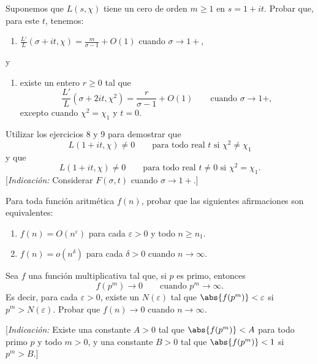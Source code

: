 \documentclass[12pt,a4paper]{book}
\begin{document}
    \begin{ejercicio}
        Suponemos que $L(s,\chi)$ tiene un cero de orden $m\geq1$ en $s=1+it$. Probar que, para
        este $t$, tenemos:
        \begin{enumerate}
            \item[(a)] $\displaystyle\frac{L'}{L}(\sigma+it,\chi)=\frac{m}{\sigma-1}+O(1)$ cuando $\sigma\to1+$,
        \end{enumerate}
        y
        \begin{enumerate}
            \item[(b)] existe un entero $r\geq0$ tal que
            \begin{equation*}
                \frac{L'}{L}(\sigma+2it,\chi^{2})=\frac{r}{\sigma-1}+O(1)\qquad\text{cuando }\sigma\to1+,
            \end{equation*}
            excepto cuando $\chi^{2}=\chi_{1}$ y $t=0$.
        \end{enumerate}
    \end{ejercicio}

    \begin{ejercicio}
        Utilizar los ejercicios 8 y 9 para demostrar que
        \begin{equation*}
            L(1+it,\chi)\neq0\qquad\text{para todo real }t\text{ si }\chi^{2}\neq\chi_{1}
        \end{equation*}
        y que
        \begin{equation*}
            L(1+it,\chi)\neq0\qquad\text{para todo real }t\neq0\text{ si }\chi^{2}=\chi_{1}.
        \end{equation*}
        [\textit{Indicación:} Considerar $F(\sigma,t)$ cuando $\sigma\to1+$.]
    \end{ejercicio}

    \begin{ejercicio}
        Para toda función aritmética $f(n)$, probar que las siguientes afirmaciones son
        equivalentes:
        \begin{enumerate}
            \item[(a)] $f(n)=O(n^{\varepsilon})$ para cada $\varepsilon>0$ y todo
            $n\geq n_{1}$.
            \item[(b)] $f(n)=o(n^{\delta})$ para cada $\delta>0$ cuando $n\to\infty$.
        \end{enumerate}
    \end{ejercicio}

    \begin{ejercicio}
        Sea $f$ una función multiplicativa tal que, si $p$ es primo, entonces
        \begin{equation*}
            f(p^{m})\to0\qquad\text{cuando }p^{m}\to\infty.
        \end{equation*}
        Es decir, para cada $\varepsilon>0$, existe un $N(\varepsilon)$ tal que
        $\abs{f(p^{m})}<\varepsilon$ si $p^{m}>N(\varepsilon)$. Probar que $f(n)\to0$ cuando
        $n\to\infty$.

        [\textit{Indicación:} Existe una constante $A>0$ tal que $\abs{f(p^{m})}<A$ para todo
        primo $p$ y todo $m>0$, y una constante $B>0$ tal que $\abs{f(p^{m})}<1$ si $p^{m}>B$.]
    \end{ejercicio}
\end{document}

